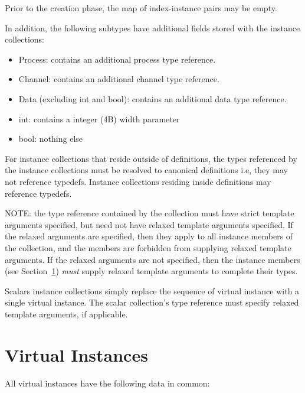 Prior to the creation phase, the map of index-instance pairs may be empty.  

In addition, the following subtypes have additional fields stored with 
the instance collections:

\begin{itemize}
\item Process: contains an additional process type reference.  
\item Channel: contains an additional channel type reference.  
\item Data (excluding int and bool): 
	contains an additional data type reference.  
\item int: contains a integer (4B) width parameter
\item bool: nothing else
\end{itemize}

For instance collections that reside outside of definitions, 
the types referenced by the instance collections must be resolved
to canonical definitions i.e, they may not reference typedefs.  
Instance collections residing inside definitions may reference typedefs.  

NOTE: the type reference contained by the collection must have
strict template arguments specified, but need not have
relaxed template arguments specified.  
If the relaxed arguments are specified, then they apply
to all instance members of the collection, 
and the members are forbidden from supplying relaxed template arguments.  
If the relaxed arguments are not specified, then the 
instance members (see Section~\ref{sec:instance:virtual})
\emph{must} supply relaxed template arguments to complete their types.  

Scalars instance collections simply replace the sequence of 
virtual instance with a single virtual instance.  
The scalar collection's type reference must specify relaxed template
arguments, if applicable.  

\section{Virtual Instances}
\label{sec:instance:virtual}

All virtual instances have the following data in common:

